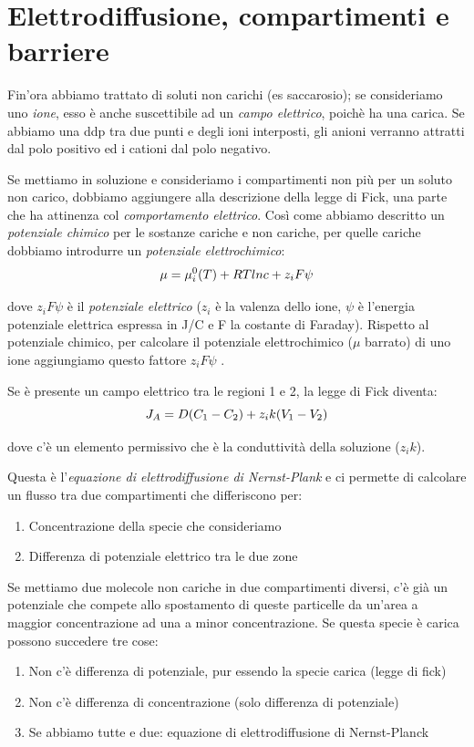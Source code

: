 \documentclass[a4paper,12pt]{article}
\begin{document}
\section{Elettrodiffusione, compartimenti e barriere}
Fin'ora abbiamo trattato di soluti non carichi (es saccarosio); se consideriamo uno \emph{ione}, esso è anche suscettibile ad un \emph{campo elettrico}, poichè ha una carica. Se abbiamo una ddp tra due punti e degli ioni interposti, gli anioni verranno attratti dal polo positivo ed i cationi dal polo negativo.

Se mettiamo in soluzione e consideriamo i compartimenti non più per un soluto non carico, dobbiamo aggiungere alla descrizione della legge di Fick, una parte che ha attinenza col \emph{comportamento elettrico}.
Così come abbiamo descritto un \emph{potenziale chimico} per le sostanze cariche e non cariche, per quelle cariche dobbiamo introdurre un \emph{potenziale elettrochimico}:
\begin{equation}
\centering
\mu= \mu_{i}^{0}(T) + RTlnc + z_{i}F\psi
\end{equation}
				
dove $z_{i}F\psi$ è il \emph{potenziale elettrico} ($z_{i}$ è la valenza dello ione, $\psi$ è l'energia potenziale elettrica espressa in J/C e F la costante di Faraday).
Rispetto al potenziale chimico, per calcolare il potenziale elettrochimico ($\mu$ barrato) di uno ione aggiungiamo questo fattore $z_{i}F\psi$ .

Se è presente un campo elettrico tra le regioni 1 e 2, la legge di Fick diventa:
\begin{equation}
\centering
J_{A} = D(C_{1}-C_{2}) + z_{i}k(V_{1}-V_{2}) 		
\end{equation}

dove c'è un elemento permissivo che è la conduttività della soluzione ($z_{i}k$).

Questa è l'\emph{equazione di elettrodiffusione di Nernst-Plank} e ci permette di calcolare un flusso tra due compartimenti che differiscono per:
\begin{enumerate}
\item{Concentrazione della specie che consideriamo}
\item{Differenza di potenziale elettrico tra le due zone}
\end{enumerate}

Se mettiamo due molecole non cariche in due compartimenti diversi, c'è già un potenziale che compete allo spostamento di queste particelle da un'area a maggior concentrazione ad una a minor concentrazione.
Se questa specie è carica possono succedere tre cose:
\begin{enumerate}
\item{Non c'è differenza di potenziale, pur essendo la specie carica (legge di fick)}
\item{Non c'è differenza di concentrazione (solo differenza di potenziale)}
\item{Se abbiamo tutte e due: equazione di elettrodiffusione di Nernst-Planck}
\end{enumerate}
\end{document}
